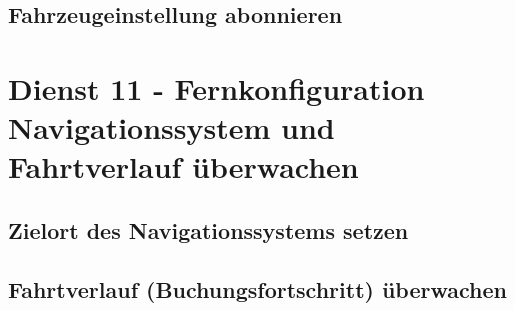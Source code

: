 \subsection*{Fahrzeugeinstellung abonnieren}
\label{subsec:Nachrichten:Dienst10:BookingSettingsSubscription}














\section{Dienst 11 - Fernkonfiguration Navigationssystem und Fahrtverlauf überwachen}
\label{sec:Nachrichten:Dienst11}

\subsection*{Zielort des Navigationssystems setzen}
\label{subsec:Nachrichten:Dienst11:SetNavigationDestination}





\subsection*{Fahrtverlauf (Buchungsfortschritt) überwachen}
\label{subsec:Nachrichten:Dienst11:BookingProgressSubscription}














